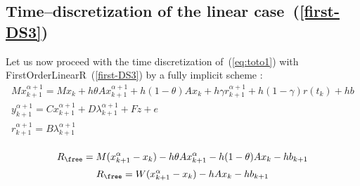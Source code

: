  
\subsection{Time--discretization of the linear case~(\ref{first-DS3}) } 
Let us now proceed with the time discretization of~(\ref{eq:toto1}) with FirstOrderLinearR~(\ref{first-DS3})  by a fully implicit scheme : 
\begin{equation}
  \begin{array}{l}
    \label{eq:toto1-DS3}
     M x^{\alpha+1}_{k+1} = M x_{k} +h\theta A x^{\alpha+1}_{k+1}+h(1-\theta) A x_k + h \gamma r^{\alpha+1}_{k+1}+ h(1-\gamma)r(t_k)  +hb\\[2mm]
     y^{\alpha+1}_{k+1} =  C x^{\alpha+1}_{k+1} + D \lambda ^{\alpha+1}_{k+1} +Fz +e\\[2mm]
     r^{\alpha+1}_{k+1} = B \lambda ^{\alpha+1}_{k+1} \\[2mm]
  \end{array}
\end{equation}

\[R_{\free} = M(x^{\alpha}_{k+1} - x_{k}) -h\theta A x^{\alpha}_{k+1} - h(1-\theta) A x_k -hb_{k+1} \]
\[R_{\free} = W(x^{\alpha}_{k+1} - x_{k}) -h A x_{k} -hb_{k+1} \]

